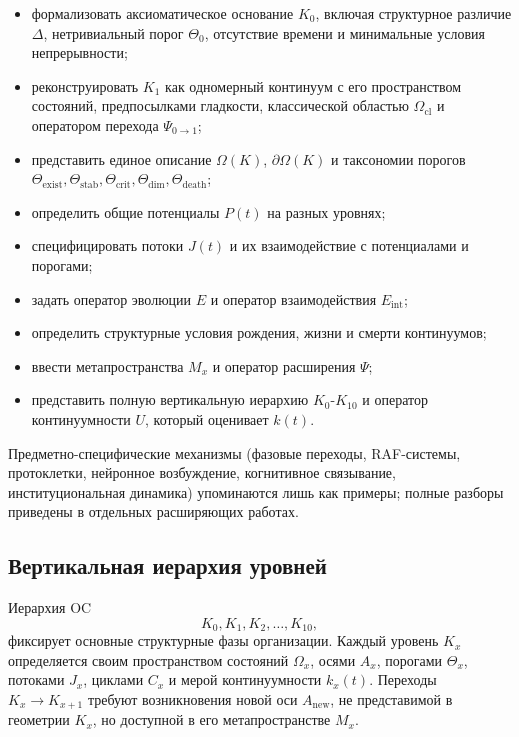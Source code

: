 \begin{itemize}
    \item формализовать аксиоматическое основание \(K_0\), включая структурное различие \(\Delta\), нетривиальный порог \(\Theta_0\), отсутствие времени и минимальные условия непрерывности;
    \item реконструировать \(K_1\) как одномерный континуум с его пространством состояний, предпосылками гладкости, классической областью \(\Omega_{\mathrm{cl}}\) и оператором перехода \(\Psi_{0\to 1}\);
    \item представить единое описание \(\Omega(K)\), \(\partial\Omega(K)\) и таксономии порогов \(\Theta_{\mathrm{exist}}, \Theta_{\mathrm{stab}}, \Theta_{\mathrm{crit}}, \Theta_{\mathrm{dim}}, \Theta_{\mathrm{death}}\);
    \item определить общие потенциалы \(P(t)\) на разных уровнях;
    \item специфицировать потоки \(J(t)\) и их взаимодействие с потенциалами и порогами;
    \item задать оператор эволюции \(E\) и оператор взаимодействия \(E_{\mathrm{int}}\);
    \item определить структурные условия рождения, жизни и смерти континуумов;
    \item ввести метапространства \(M_x\) и оператор расширения \(\Psi\);
    \item представить полную вертикальную иерархию \(K_0\)-\(K_{10}\) и оператор континуумности \(U\), который оценивает \(k(t)\).
\end{itemize}

Предметно-специфические механизмы (фазовые переходы, RAF-системы, протоклетки, нейронное возбуждение, когнитивное связывание, институциональная динамика) упоминаются лишь как примеры; полные разборы приведены в отдельных расширяющих работах.

\subsection{Вертикальная иерархия уровней}

Иерархия OC
\[
K_0, K_1, K_2, \dots, K_{10},
\]
фиксирует основные структурные фазы организации. Каждый уровень \(K_x\) определяется своим пространством состояний \(\Omega_x\), осями \(A_x\), порогами \(\Theta_x\), потоками \(J_x\), циклами \(C_x\) и мерой континуумности \(k_x(t)\). Переходы \(K_x \to K_{x+1}\) требуют возникновения новой оси \(A_{\mathrm{new}}\), не представимой в геометрии \(K_x\), но доступной в его метапространстве \(M_x\).

